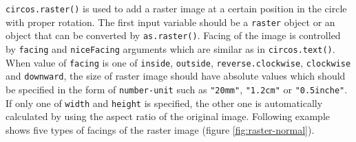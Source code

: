 \documentclass[]{book}
\newenvironment{Shaded}{\begin{snugshade}}{\end{snugshade}}
\newcommand{\KeywordTok}[1]{\textcolor[rgb]{0.13,0.29,0.53}{\textbf{#1}}}
\newcommand{\DataTypeTok}[1]{\textcolor[rgb]{0.13,0.29,0.53}{#1}}
\newcommand{\DecValTok}[1]{\textcolor[rgb]{0.00,0.00,0.81}{#1}}
\newcommand{\StringTok}[1]{\textcolor[rgb]{0.31,0.60,0.02}{#1}}
\newcommand{\OtherTok}[1]{\textcolor[rgb]{0.56,0.35,0.01}{#1}}
\newcommand{\ControlFlowTok}[1]{\textcolor[rgb]{0.13,0.29,0.53}{\textbf{#1}}}
\newcommand{\OperatorTok}[1]{\textcolor[rgb]{0.81,0.36,0.00}{\textbf{#1}}}
\newcommand{\NormalTok}[1]{#1}
\theoremstyle{definition}
\theoremstyle{definition}
\theoremstyle{remark}
\begin{document}
\texttt{circos.raster()} is used to add a raster image at a certain
position in the circle with proper rotation. The first input variable
should be a \texttt{raster} object or an object that can be converted by
\texttt{as.raster()}. Facing of the image is controlled by
\texttt{facing} and \texttt{niceFacing} arguments which are similar as
in \texttt{circos.text()}. When value of \texttt{facing} is one of
\texttt{inside}, \texttt{outside}, \texttt{reverse.clockwise},
\texttt{clockwise} and \texttt{downward}, the size of raster image
should have absolute values which should be specified in the form of
\texttt{number-unit} such as \texttt{"20mm"}, \texttt{"1.2cm"} or
\texttt{"0.5inche"}. If only one of \texttt{width} and \texttt{height}
is specified, the other one is automatically calculated by using the
aspect ratio of the original image. Following example shows five types
of facings of the raster image (figure \ref{fig:raster-normal}).

\begin{Shaded}
\end{Shaded}
\end{document}

